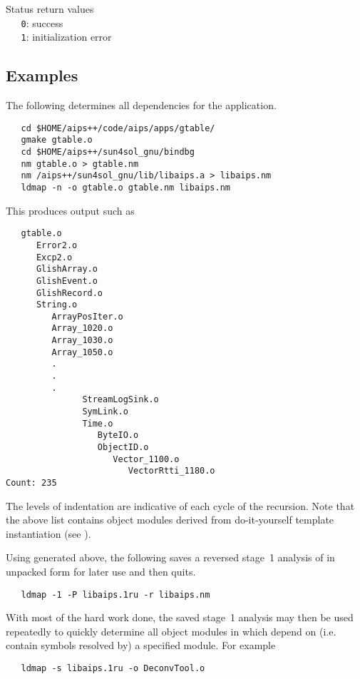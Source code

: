Status return values
\\ \verb+   0+: success
\\ \verb+   1+: initialization error
 
\subsection*{Examples}
 
The following determines all dependencies for the  application.

\begin{verbatim}
   cd $HOME/aips++/code/aips/apps/gtable/
   gmake gtable.o
   cd $HOME/aips++/sun4sol_gnu/bindbg
   nm gtable.o > gtable.nm
   nm /aips++/sun4sol_gnu/lib/libaips.a > libaips.nm
   ldmap -n -o gtable.o gtable.nm libaips.nm
\end{verbatim}

\noindent
This produces output such as

\begin{verbatim}
   gtable.o
      Error2.o
      Excp2.o
      GlishArray.o
      GlishEvent.o
      GlishRecord.o
      String.o
         ArrayPosIter.o
         Array_1020.o
         Array_1030.o
         Array_1050.o
         .
         .
         .
               StreamLogSink.o
               SymLink.o
               Time.o
                  ByteIO.o
                  ObjectID.o
                     Vector_1100.o
                        VectorRtti_1180.o
Count: 235
\end{verbatim}

\noindent
The levels of indentation are indicative of each cycle of the recursion.  Note
that the above list contains object modules derived from do-it-yourself
template instantiation (see ).

Using  generated above, the following saves a reversed
stage~1 analysis of  in unpacked form for later use and then
quits.

\begin{verbatim}
   ldmap -1 -P libaips.1ru -r libaips.nm
\end{verbatim}

\noindent
With most of the hard work done, the saved stage~1 analysis may then be used
repeatedly to quickly determine all object modules in  which
depend on (i.e. contain symbols resolved by) a specified module.  For example
 
\begin{verbatim}
   ldmap -s libaips.1ru -o DeconvTool.o
\end{verbatim}

